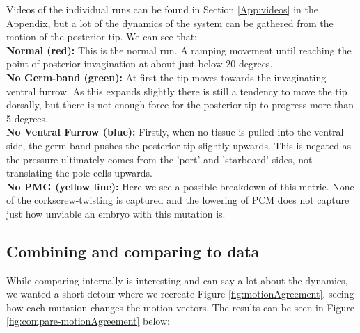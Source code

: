 \begin{figure}[H]
    \label{fig:PCM-mutants}
\end{figure}


Videos of the individual runs can be found in Section \ref{App:videos} in the Appendix, but a lot of the dynamics of the system can be gathered from the motion of the posterior tip. We can see that:\\
\textbf{Normal (red):} This is the normal run. A ramping movement until reaching the point of posterior invagination at about just below 20 degrees. \\
\textbf{No Germ-band (green):} At first the tip moves towards the invaginating ventral furrow. As this expands slightly there is still a tendency to move the tip dorsally, but there is not enough force for the posterior tip to progress more than 5 degrees. \\
\textbf{No Ventral Furrow (blue):} Firstly, when no tissue is pulled into the ventral side, the germ-band pushes the posterior tip slightly upwards. This is negated as the pressure ultimately comes from the 'port' and 'starboard' sides, not translating the pole cells upwards.\\
\textbf{No PMG (yellow line):} Here we see a possible breakdown of this metric. None of the corkscrew-twisting is captured and the lowering of PCM does not capture just how unviable an embryo with this mutation is.  


\subsection{Combining and comparing to data}
While comparing internally is interesting and can say a lot about the dynamics, we wanted a short detour where we recreate Figure \ref{fig:motionAgreement}, seeing how each mutation changes the motion-vectors. The results can be seen in Figure \ref{fig:compare-motionAgreement} below:

